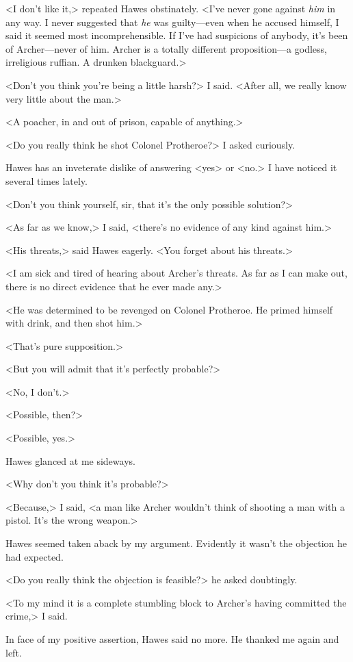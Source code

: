 <I don't like it,> repeated Hawes obstinately. <I've never gone against \emph{him} in any way. I never suggested that \emph{he} was guilty—even when he accused himself, I said it seemed most incomprehensible. If I've had suspicions of anybody, it's been of Archer—never of him. Archer is a totally different proposition—a godless, irreligious ruffian. A drunken blackguard.>

<Don't you think you're being a little harsh?> I said. <After all, we really know very little about the man.>

<A poacher, in and out of prison, capable of anything.>

<Do you really think he shot Colonel Protheroe?> I asked curiously.

Hawes has an inveterate dislike of answering <yes> or <no.> I have noticed it several times lately.

<Don't you think yourself, sir, that it's the only possible solution?>

<As far as we know,> I said, <there's no evidence of any kind against him.>

<His threats,> said Hawes eagerly. <You forget about his threats.>

<I am sick and tired of hearing about Archer's threats. As far as I can make out, there is no direct evidence that he ever made any.>

<He was determined to be revenged on Colonel Protheroe. He primed himself with drink, and then shot him.>

<That's pure supposition.>

<But you will admit that it's perfectly probable?>

<No, I don't.>

<Possible, then?>

<Possible, yes.>

Hawes glanced at me sideways.

<Why don't you think it's probable?>

<Because,> I said, <a man like Archer wouldn't think of shooting a man with a pistol. It's the wrong weapon.>

Hawes seemed taken aback by my argument. Evidently it wasn't the objection he had expected.

<Do you really think the objection is feasible?> he asked doubtingly.

<To my mind it is a complete stumbling block to Archer's having committed the crime,> I said.

In face of my positive assertion, Hawes said no more. He thanked me again and left.

